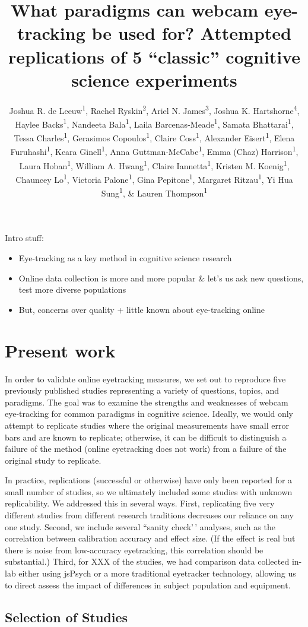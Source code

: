 \documentclass[
  man,floatsintext]{apa6}
\title{What paradigms can webcam eye-tracking be used for? Attempted replications of 5 ``classic'' cognitive science experiments}
\author{Joshua R. de Leeuw\textsuperscript{1}, Rachel Ryskin\textsuperscript{2}, Ariel N. James\textsuperscript{3}, Joshua K. Hartshorne\textsuperscript{4}, Haylee Backs\textsuperscript{1}, Nandeeta Bala\textsuperscript{1}, Laila Barcenas-Meade\textsuperscript{1}, Samata Bhattarai\textsuperscript{1}, Tessa Charles\textsuperscript{1}, Gerasimos Copoulos\textsuperscript{1}, Claire Coss\textsuperscript{1}, Alexander Eisert\textsuperscript{1}, Elena Furuhashi\textsuperscript{1}, Keara Ginell\textsuperscript{1}, Anna Guttman-McCabe\textsuperscript{1}, Emma (Chaz) Harrison\textsuperscript{1}, Laura Hoban\textsuperscript{1}, William A. Hwang\textsuperscript{1}, Claire Iannetta\textsuperscript{1}, Kristen M. Koenig\textsuperscript{1}, Chauncey Lo\textsuperscript{1}, Victoria Palone\textsuperscript{1}, Gina Pepitone\textsuperscript{1}, Margaret Ritzau\textsuperscript{1}, Yi Hua Sung\textsuperscript{1}, \& Lauren Thompson\textsuperscript{1}}
\date{}
\affiliation{\vspace{0.5cm}\textsuperscript{1} Cognitive Science Department, Vassar College\\\textsuperscript{2} Department of Cognitive \& Information Science, University of California, Merced\\\textsuperscript{3} Psychology Department, Macalester College\\\textsuperscript{4} Department of Psychology \& Neuroscience, Boston College}
\begin{document}
\maketitle

Intro stuff:

\begin{itemize}
\item
  Eye-tracking as a key method in cognitive science research
\item
  Online data collection is more and more popular \& let's us ask new
  questions, test more diverse populations
\item
  But, concerns over quality + little known about eye-tracking online
\end{itemize}

\hypertarget{present-work}{%
\section{Present work}\label{present-work}}

In order to validate online eyetracking measures, we set out to reproduce five previously published studies representing a variety of questions, topics, and paradigms. The goal was to examine the strengths and weaknesses of webcam eye-tracking for common paradigms in cognitive science. Ideally, we would only attempt to replicate studies where the original measurements have small error bars and are known to replicate; otherwise, it can be difficult to distinguish a failure of the method (online eyetracking does not work) from a failure of the original study to replicate.

In practice, replications (successful or otherwise) have only been reported for a small number of studies, so we ultimately included some studies with unknown replicability. We addressed this in several ways. First, replicating five very different studies from different research traditions decreases our reliance on any one study. Second, we include several ``sanity check'\,' analyses, such as the correlation between calibration accuracy and effect size. (If the effect is real but there is noise from low-accuracy eyetracking, this correlation should be substantial.) Third, for XXX of the studies, we had comparison data collected in-lab either using jsPsych or a more traditional eyetracker technology, allowing us to direct assess the impact of differences in subject population and equipment.

\hypertarget{selection-of-studies}{%
\subsection{Selection of Studies}\label{selection-of-studies}}
\end{document}
